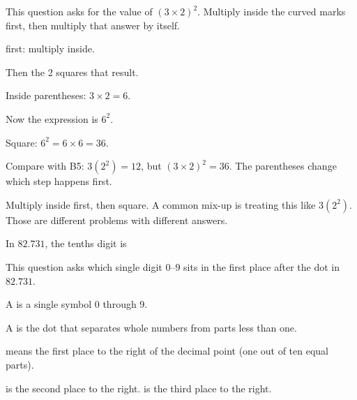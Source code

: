 
This question asks for the value of $(3 \times 2)^{2}$. Multiply inside the curved
marks first, then multiply that answer by itself.

\begin{words}
  \item {}first: multiply inside.
  \item Then the 2 squares that result.
\end{words}

\begin{steps}
  \item Inside parentheses: $3 \times 2 = 6$.
  \item Now the expression is $6^{2}$.
  \item Square: $6^{2} = 6 \times 6 = 36$.
  \item Compare with B5: $3(2^{2}) = 12$, but $(3 \times 2)^{2} = 36$. The
        parentheses change which step happens first.
\end{steps}


Multiply inside first, then square. A common mix-up is treating this like
$3(2^{2})$. Those are different problems with different answers.



In $82.731$, the tenths digit is \blank[2.4cm]


This question asks which single digit $0$--$9$ sits in the first place after the
dot in $82.731$.

\begin{words}
  \item A is a single symbol 0 through 9.
  \item A is the dot that separates whole numbers from parts less than one.
  \item {}means the first place to the right of the decimal point (one out of ten equal parts).
  \item {}is the second place to the right. is the third place to the right.
\end{words}

